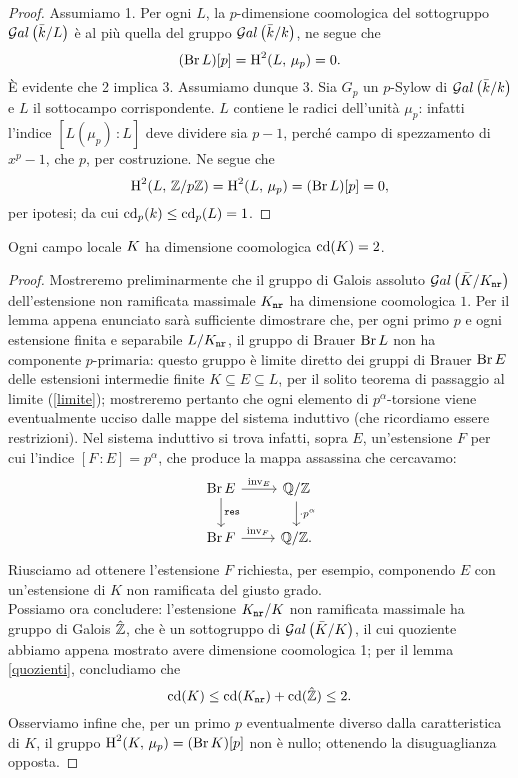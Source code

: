 \begin{proof}
	Assumiamo 1. Per ogni $ L $, la $ p $-dimensione coomologica del sottogruppo $ \mathcal{G}al\left( \bar{k}/L \right) $ è al più quella del gruppo $ \mathcal{G}al\left( \bar{k}/k \right) $, ne segue che
	\[ (\operatorname{Br} L) [p] = \operatorname{H}^2(L, \, \mu_p) = 0. \] 
	È evidente che 2 implica 3. Assumiamo dunque 3. Sia $ G_p $ un $ p $-Sylow di $ \mathcal{G}al\left( \bar{k}/k \right) $ e $ L $ il sottocampo corrispondente. $ L $ contiene le radici dell'unità $ \mu_p $: infatti l'indice $ [L(\mu_p)\,\colon L] $ deve dividere sia $ p-1 $, perché campo di spezzamento di $ x^p-1 $, che $ p $, per costruzione. Ne segue che
	\[ \operatorname{H}^2(L, \, \mathbb{Z}/p\mathbb{Z}) = \operatorname{H}^2(L, \, \mu_p) = (\operatorname{Br} L)[p] = 0, \]
	per ipotesi; da cui $ \operatorname{cd}_p(k) \leq \operatorname{cd}_p(L) = 1 $.
\end{proof}

\begin{theorem}
	Ogni campo locale $ K $ ha dimensione coomologica $ \operatorname{cd}(K) = 2 $. 
\end{theorem}
\begin{proof}
	Mostreremo preliminarmente che il gruppo di Galois assoluto $ \mathcal{G}al\left( \bar{K}/K_\mathtt{nr} \right) $ dell'estensione non ramificata massimale $ K_\mathtt{nr} $ ha dimensione coomologica $ 1 $. Per il lemma appena enunciato sarà sufficiente dimostrare che, per ogni primo $ p $ e ogni estensione finita e separabile $ L/K_\mathtt{nr} $, il gruppo di Brauer $ \operatorname{Br} L $ non ha componente $ p $-primaria: questo gruppo è limite diretto dei gruppi di Brauer $ \operatorname{Br} E $ delle estensioni intermedie finite $ K \subseteq E \subseteq L $, per il solito teorema di passaggio al limite (\ref{limite}); mostreremo pertanto che ogni elemento di $ p^\alpha $-torsione viene eventualmente ucciso dalle mappe del sistema induttivo (che ricordiamo essere restrizioni). Nel sistema induttivo si trova infatti, sopra $ E $, un'estensione $ F $ per cui l'indice $ [F \,\colon E] = p^\alpha $, che produce la mappa assassina che cercavamo:
	\[ \begin{tikzcd}
	\Br E \rar["\inv_E"] \dar["\Res"]
	& \Q/\Z \dar["\cdot p^\alpha"] \\
	\Br F \rar["\inv_F"]
	& \Q/\Z.
	\end{tikzcd} \]
	Riusciamo ad ottenere l'estensione $ F $ richiesta, per esempio, componendo $ E $ con un'estensione di $ K $ non ramificata del giusto grado.\\
	
	Possiamo ora concludere: l'estensione $ K_\mathtt{nr} /K $ non ramificata massimale ha gruppo di Galois $ \hat{\mathbb{Z}} $, che è un sottogruppo di $ \mathcal{G}al\left( \bar{K}/K \right) $, il cui quoziente abbiamo appena mostrato avere dimensione coomologica 1; per il lemma \ref{quozienti}, concludiamo che 
	$$  \operatorname{cd}(K) \leq \operatorname{cd}(K_\mathtt{nr}) + \operatorname{cd}(\hat{\mathbb{Z}}) \leq 2.  $$
	Osserviamo infine che, per un primo $ p $ eventualmente diverso dalla caratteristica di $ K $, il gruppo $ \operatorname{H}^2(K, \, \mu_p) = (\operatorname{Br} K)[p] $ non è nullo; ottenendo la disuguaglianza opposta.
\end{proof}